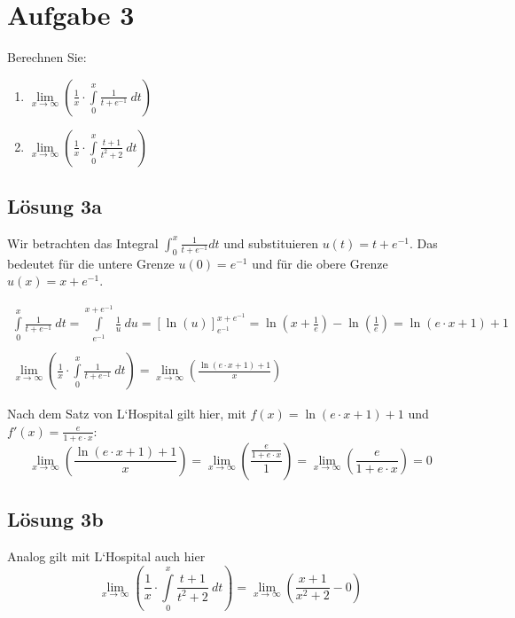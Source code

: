 \documentclass[main.tex]{subfiles}
\begin{document}
\section{Aufgabe 3}

Berechnen Sie:

\begin{enumerate}
    \item $\lim\limits _{x\rightarrow \infty }\left(\frac{1}{x} \cdotp \int\limits _{0}^{x}\frac{1}{t+e^{-1}} \ dt\right)$
    \item $\lim\limits _{x\rightarrow \infty }\left(\frac{1}{x} \cdotp \int\limits _{0}^{x}\frac{t+1}{t^{2} +2} \ dt\right)$
\end{enumerate}

\subsection{Lösung 3a}
Wir betrachten das Integral $\int\nolimits _{0}^{x}\frac{1}{t+e^{-1}} dt$ und substituieren $u( t) =t+e^{-1}$. Das bedeutet für die untere Grenze $u( 0) =e^{-1}$ und für die obere Grenze $u( x) =x+e^{-1}$.

\begin{gather*}
    \int\limits _{0}^{x}\frac{1}{t+e^{-1}} \ dt=\int\limits _{e^{-1}}^{x+e^{-1}}\frac{1}{u} \ du=[\ln( u)]_{e^{-1}}^{x+e^{-1}} =\ln\left( x+\frac{1}{e}\right) -\ln\left(\frac{1}{e}\right) =\ln( e\cdotp x+1) +1\\
    \\
    \lim\limits _{x\rightarrow \infty }\left(\frac{1}{x} \cdotp \int\limits _{0}^{x}\frac{1}{t+e^{-1}} \ dt\right) =\lim\limits _{x\rightarrow \infty }\left(\frac{\ln( e\cdotp x+1) +1}{x}\right)
\end{gather*}

Nach dem Satz von L`Hospital gilt hier, mit $f( x) =\ln( e\cdotp x+1) +1$ und $f'( x) =\frac{e}{1+e\cdotp x}$:
\begin{equation*}
    \lim\limits _{x\rightarrow \infty }\left(\frac{\ln( e\cdotp x+1) +1}{x}\right) =\lim\limits _{x\rightarrow \infty }\left(\frac{\frac{e}{1+e\cdotp x}}{1}\right) =\lim\limits _{x\rightarrow \infty }\left(\frac{e}{1+e\cdotp x}\right) =0
\end{equation*}

\subsection{Lösung 3b}

Analog gilt mit L`Hospital auch hier
\begin{equation*}
    \lim\limits _{x\rightarrow \infty }\left(\frac{1}{x} \cdotp \int\limits _{0}^{x}\frac{t+1}{t^{2} +2} \ dt\right) =\lim\limits _{x\rightarrow \infty }\left(\frac{x+1}{x^{2} +2} -0\right)
\end{equation*}
\end{document}
